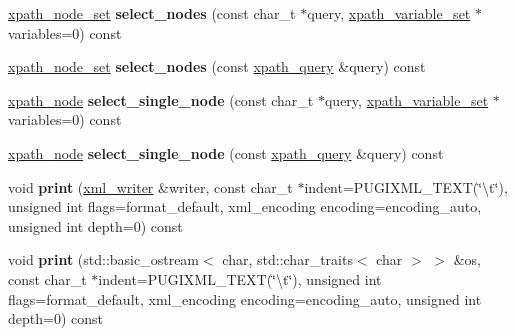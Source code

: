 \begin{DoxyCompactItemize}
\item 
\hypertarget{classpugi_1_1xml__node_a32ade4ad1281495923687321825dbb1b}{\hyperlink{classpugi_1_1xpath__node__set}{xpath\+\_\+node\+\_\+set} {\bfseries select\+\_\+nodes} (const char\+\_\+t $\ast$query, \hyperlink{classpugi_1_1xpath__variable__set}{xpath\+\_\+variable\+\_\+set} $\ast$variables=0) const }\label{classpugi_1_1xml__node_a32ade4ad1281495923687321825dbb1b}

\item 
\hypertarget{classpugi_1_1xml__node_acc6e39ed181fac7f56e69280ad51fac6}{\hyperlink{classpugi_1_1xpath__node__set}{xpath\+\_\+node\+\_\+set} {\bfseries select\+\_\+nodes} (const \hyperlink{classpugi_1_1xpath__query}{xpath\+\_\+query} \&query) const }\label{classpugi_1_1xml__node_acc6e39ed181fac7f56e69280ad51fac6}

\item 
\hypertarget{classpugi_1_1xml__node_a51ae1ebf6d78f80f9e91f5d64c143d78}{\hyperlink{classpugi_1_1xpath__node}{xpath\+\_\+node} {\bfseries select\+\_\+single\+\_\+node} (const char\+\_\+t $\ast$query, \hyperlink{classpugi_1_1xpath__variable__set}{xpath\+\_\+variable\+\_\+set} $\ast$variables=0) const }\label{classpugi_1_1xml__node_a51ae1ebf6d78f80f9e91f5d64c143d78}

\item 
\hypertarget{classpugi_1_1xml__node_a94b942e9f4438836b62d260ee65ab43f}{\hyperlink{classpugi_1_1xpath__node}{xpath\+\_\+node} {\bfseries select\+\_\+single\+\_\+node} (const \hyperlink{classpugi_1_1xpath__query}{xpath\+\_\+query} \&query) const }\label{classpugi_1_1xml__node_a94b942e9f4438836b62d260ee65ab43f}

\item 
\hypertarget{classpugi_1_1xml__node_aed2c5f51a149e116cfe7970c6a5df749}{void {\bfseries print} (\hyperlink{classpugi_1_1xml__writer}{xml\+\_\+writer} \&writer, const char\+\_\+t $\ast$indent=P\+U\+G\+I\+X\+M\+L\+\_\+\+T\+E\+X\+T(\char`\"{}\textbackslash{}t\char`\"{}), unsigned int flags=format\+\_\+default, xml\+\_\+encoding encoding=encoding\+\_\+auto, unsigned int depth=0) const }\label{classpugi_1_1xml__node_aed2c5f51a149e116cfe7970c6a5df749}

\item 
\hypertarget{classpugi_1_1xml__node_a930c02bae5ea9cc206ba358eaff96238}{void {\bfseries print} (std\+::basic\+\_\+ostream$<$ char, std\+::char\+\_\+traits$<$ char $>$ $>$ \&os, const char\+\_\+t $\ast$indent=P\+U\+G\+I\+X\+M\+L\+\_\+\+T\+E\+X\+T(\char`\"{}\textbackslash{}t\char`\"{}), unsigned int flags=format\+\_\+default, xml\+\_\+encoding encoding=encoding\+\_\+auto, unsigned int depth=0) const }\label{classpugi_1_1xml__node_a930c02bae5ea9cc206ba358eaff96238}


\end{DoxyCompactItemize}
